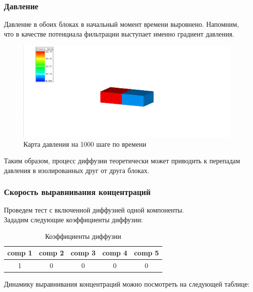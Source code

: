 \documentclass[12pt,a4paper]{article}
\begin{document}
\subsubsection{Давление}
Давление в обоих блоках в начальный момент времени выровнено. Напомним, что в качестве потенциала фильтрации выступает именно градиент давления.

\begin{figure} [!h]
\begin{center}
\caption{Карта давления на 1000 шаге по времени}
\includegraphics[width=1.2\textwidth]{pics/pressuret211_1.png}
\end{center}
\end{figure}

Таким образом, процесс диффузии теоретически может приводить к перепадам давления в изолированных друг от друга блоках.
\newpage
\subsubsection{Скорость выравнивания концентраций}
Проведем тест с включенной диффузией одной компоненты.\\
Зададим следующие коэффициенты диффузии:
\begin{table}[!h]
\caption{Коэффициенты диффузии}
\begin{center}
\begin{tabular}{|c|c|c|c|c|}
\hline
comp 1 & comp 2 & comp 3 & comp 4 & comp 5\\
\hline
1 & 0 & 0 & 0 & 0\\
\hline
\end{tabular}
\end{center}
\end{table}

Динамику выравнивания концентраций можно посмотреть на следующей таблице:
\end{document}
